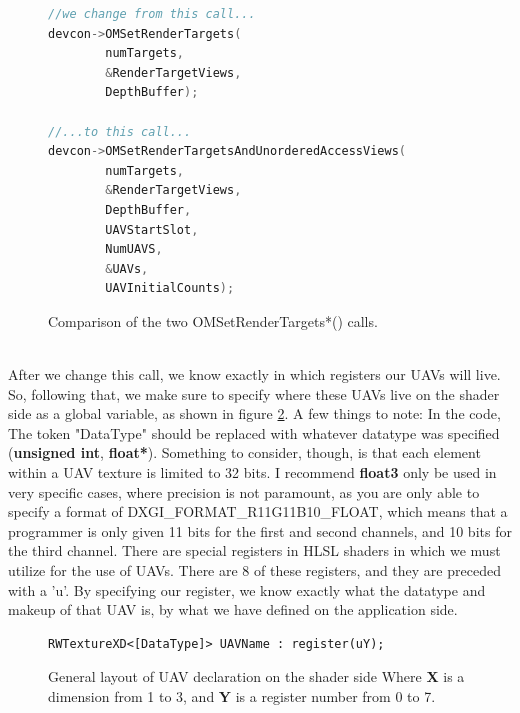 \documentclass[a4paper, 12pt]{article}
\begin{document}
\begin{figure}[h]
\begin{lstlisting}[language=C++]
//we change from this call...
devcon->OMSetRenderTargets(
		numTargets, 
		&RenderTargetViews, 
		DepthBuffer);

//...to this call...
devcon->OMSetRenderTargetsAndUnorderedAccessViews(
		numTargets,
		&RenderTargetViews,
		DepthBuffer,
		UAVStartSlot,
		NumUAVS,
		&UAVs,
		UAVInitialCounts);
\end{lstlisting}
\caption{Comparison of the two OMSetRenderTargets*() calls.}
\label{code:setRTV}
\end{figure}

\noindent \\ After we change this call, we know exactly in which registers
our UAVs will live. So, following that, we make sure to specify where these
UAVs live on the shader side as a global variable, as shown in figure
\ref{code:UAVShaderSide}. A few things to note: In the code, The token
"DataType" should be replaced with whatever datatype was specified
(\textbf{unsigned int}, \textbf{float*}). Something to consider, though, is
that each element within a UAV texture is limited to 32 bits. I recommend
\textbf{float3} only be used in very specific cases, where precision is not
paramount, as you are only able to specify a format of
DXGI\_FORMAT\_R11G11B10\_FLOAT, which means that a programmer is only given 11
bits for the first and second channels, and 10 bits for the third channel.
There are special registers in HLSL shaders in which we must utilize for the
use of UAVs. There are 8 of these registers, and they are preceded with a
'u'. By specifying our register, we know exactly what the datatype and
makeup of that UAV is, by what we have defined on the application side.

\begin{figure}[h]
\begin{lstlisting}[language=HLSL]
RWTextureXD<[DataType]> UAVName : register(uY);
\end{lstlisting}
\caption{General layout of UAV declaration on the shader side Where \textbf{X} is a dimension from 1 to 3, and \textbf{Y} is a register number from 0 to 7. }
\label{code:UAVShaderSide}
\end{figure}
\end{document}
